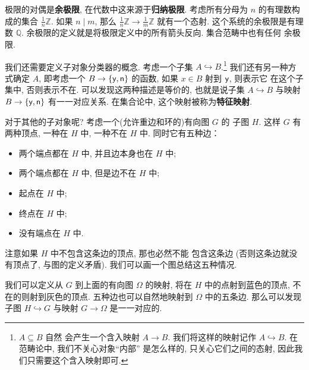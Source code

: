 极限的对偶是\textbf{余极限}, 在代数中这来源于\textbf{归纳极限}.
考虑所有分母为 \(n\) 的有理数构成的集合 \(\frac1n\mathbb Z\).
如果 \(n\mid m\), 那么 \(\frac1n\mathbb Z \to \frac1m
\mathbb Z\) 就有一个态射. 这个系统的余极限是有理数 \(\mathbb Q\).
余极限的定义就是将极限定义中的所有箭头反向. 集合范畴中也有任何
余极限.

我们还需要定义子对象分类器的概念. 考虑一个子集
\(A \hookrightarrow B\).\footnote{\(A \subseteq B\) 自然
会产生一个含入映射 \(A \to B\). 我们将这样的映射记作
\(A \hookrightarrow B\). 在范畴论中, 我们不关心对象“内部”
是怎么样的, 只关心它们之间的态射, 因此我们只需要这个含入映射即可.}
我们还有另一种方式确定 \(A\), 即考虑一个
\(B \to \{\textsf{y}, \textsf{n}\}\)
的函数, 如果 \(x \in B\) 射到 \(\textsf{y}\), 则表示它
在这个子集中, 否则表示不在. 可以发现这两种描述是等价的,
也就是说子集 \(A \hookrightarrow B\) 与映射
\(B \to \{\textsf{y},\textsf{n}\}\) 有一一对应关系.
在集合论中, 这个映射被称为\textbf{特征映射}.

对于其他的子对象呢? 考虑一个(允许重边和环的)有向图 \(G\) 的
子图 \(H\). 这样 \(G\) 有两种顶点, 一种在 \(H\) 中,
一种不在 \(H\) 中. 同时它有五种边：
\begin{itemize}
\item 两个端点都在 \(H\) 中, 并且边本身也在 \(H\) 中;
\item 两个端点都在 \(H\) 中, 但是边不在 \(H\) 中;
\item 起点在 \(H\) 中;
\item 终点在 \(H\) 中;
\item 没有端点在 \(H\) 中.
\end{itemize}
注意如果 \(H\) 中不包含这条边的顶点, 那也必然不能
包含这条边 (否则这条边就没有顶点了, 与图的定义矛盾).
我们可以画一个图总结这五种情况.
\begin{center}
\end{center}
我们可以定义从 \(G\) 到上面的有向图 \(\Omega\) 的映射,
将在 \(H\) 中的点射到蓝色的顶点, 不在的则射到灰色的顶点.
五种边也可以自然地映射到 \(\Omega\) 中的五条边. 那么可以发现
子图 \(H \hookrightarrow G\) 与映射 \(G \to \Omega\)
是一一对应的.

